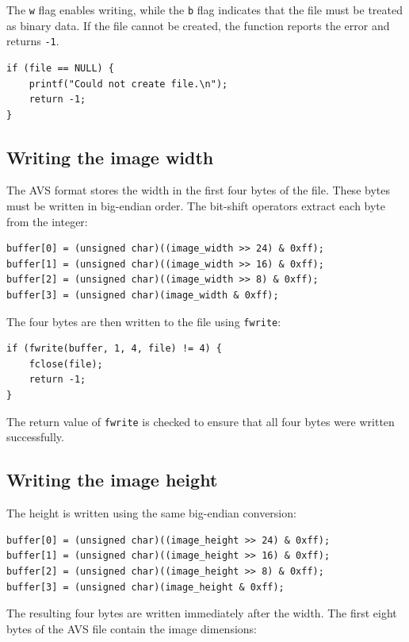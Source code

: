 The \texttt{w} flag enables writing, while the \texttt{b} flag indicates that
the file must be treated as binary data. If the file cannot be created, the
function reports the error and returns \texttt{-1}.

\begin{lstlisting}
if (file == NULL) {
    printf("Could not create file.\n");
    return -1;
}
\end{lstlisting}

\subsection{Writing the image width}

The AVS format stores the width in the first four bytes of the file. These bytes
must be written in big-endian order. The bit-shift operators extract each byte
from the integer:

\begin{lstlisting}
buffer[0] = (unsigned char)((image_width >> 24) & 0xff);
buffer[1] = (unsigned char)((image_width >> 16) & 0xff);
buffer[2] = (unsigned char)((image_width >> 8) & 0xff);
buffer[3] = (unsigned char)(image_width & 0xff);
\end{lstlisting}

The four bytes are then written to the file using \texttt{fwrite}:

\begin{lstlisting}
if (fwrite(buffer, 1, 4, file) != 4) {
    fclose(file);
    return -1;
}
\end{lstlisting}

The return value of \texttt{fwrite} is checked to ensure that all four bytes
were written successfully.

\subsection{Writing the image height}

The height is written using the same big-endian conversion:

\begin{lstlisting}
buffer[0] = (unsigned char)((image_height >> 24) & 0xff);
buffer[1] = (unsigned char)((image_height >> 16) & 0xff);
buffer[2] = (unsigned char)((image_height >> 8) & 0xff);
buffer[3] = (unsigned char)(image_height & 0xff);
\end{lstlisting}

The resulting four bytes are written immediately after the width.
The first eight bytes of the AVS file contain the image dimensions:

